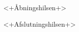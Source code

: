 \documentclass[a4paper,foldmarks=false,fromalign=right]{scrlttr2}
\begin{document}
\begin{letter}{}
  \opening{<+Åbningshilsen+>}
\closing{<+Afslutningshilsen+>}
\end{letter}
\end{document}
